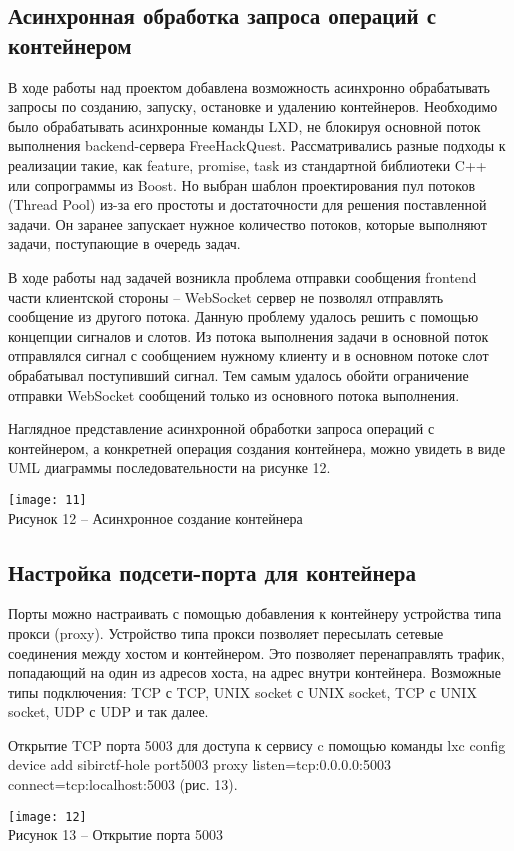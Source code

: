 \subsection{Асинхронная обработка запроса операций с контейнером}
В ходе работы над проектом добавлена возможность асинхронно обрабатывать запросы по созданию, запуску, остановке и удалению контейнеров. Необходимо было обрабатывать асинхронные команды LXD, не блокируя основной поток выполнения backend-сервера FreeHackQuest. Рассматривались разные подходы к реализации такие, как feature, promise, task из стандартной библиотеки C++ или сопрограммы из Boost. Но выбран шаблон проектирования пул потоков (Thread Pool) из-за его простоты и достаточности для решения поставленной задачи. Он заранее запускает нужное количество потоков, которые выполняют задачи, поступающие в очередь задач.\par
В ходе работы над задачей возникла проблема отправки сообщения frontend части клиентской стороны -- WebSocket сервер не позволял отправлять сообщение из другого потока. Данную проблему удалось решить с помощью концепции сигналов и слотов. Из потока выполнения задачи в основной поток отправлялся сигнал с сообщением нужному клиенту и в основном потоке слот обрабатывал поступивший сигнал. Тем самым удалось обойти ограничение отправки WebSocket сообщений только из основного потока выполнения.\par
Наглядное представление асинхронной обработки запроса операций с контейнером, а конкретней операция создания контейнера, можно увидеть в виде UML диаграммы последовательности на рисунке 12.
\begin{center}
\texttt{[image: 11]}\\
Рисунок 12 -- Асинхронное создание контейнера\\
\end{center}
\vspace{\baselineskip}

\subsection{Настройка подсети-порта для контейнера}
Порты можно настраивать с помощью добавления к контейнеру устройства типа прокси (proxy). Устройство типа прокси позволяет пересылать сетевые соединения между хостом и контейнером. Это позволяет перенаправлять трафик, попадающий на один из адресов хоста, на адрес внутри контейнера. Возможные типы подключения: TCP с TCP, UNIX socket с UNIX socket, TCP с UNIX socket, UDP с UDP и так далее.\par
Открытие TCP порта 5003 для доступа к сервису c помощью команды lxc config device add sibirctf-hole port5003 proxy listen=tcp:0.0.0.0:5003 connect=tcp:localhost:5003 (рис. 13).\par
\begin{center}
\texttt{[image: 12]}\\
Рисунок 13 -- Открытие порта 5003\\
\end{center}
\vspace{\baselineskip}

